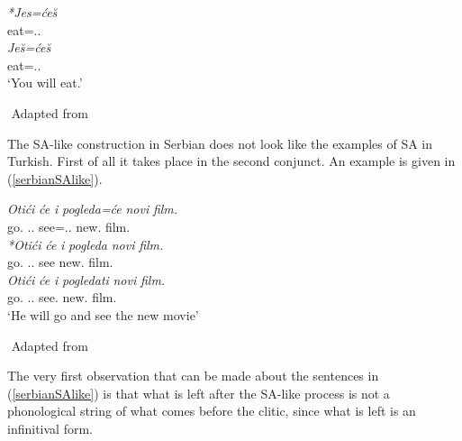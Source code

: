 \begin{exe}
    \ex \label{serbiance2}
    \begin{xlist}
        \ex 
        \gll 
        \textit{*Jes=\'{c}e\u{s}} \\ eat={\Aux}.{\Ssg}.{\Fut} \\
    
        \ex
        \gll 
        \textit{Je\u{s}=\'{c}e\u{s}} \\ eat={\Aux}.{\Ssg}.{\Fut} \\
        \glt `You will eat.'
    \end{xlist}
    ${}$ \hfill Adapted from \cite{despic2017suspended}
\end{exe}

The SA-like construction in Serbian does not look like the examples of SA in Turkish. First of all it takes place in the second conjunct. An example is given in (\ref{serbianSAlike}).

\begin{exe}
    \ex \label{serbianSAlike}
    \begin{xlist}
        \ex 
        \gll 
        \textit{Oti\'{c}i} \textit{\'{c}e} \textit{i} \textit{pogleda=\'{c}e} \textit{novi} \textit{film.} \\ go.{\Inf} {\Aux}.{\Tsg}.{\Fut} {\And} see={\Aux}.{\Tsg}.{\Fut} new.{\Acc} film.{\Acc} \\
        
        \ex 
        \gll 
        \textit{*Oti\'{c}i} \textit{\'{c}e} \textit{i} \textit{pogleda} \textit{novi} \textit{film.} \\ go.{\Inf} {\Aux}.{\Tsg}.{\Fut} {\And} see new.{\Acc} film.{\Acc} \\
        
        \ex 
        \gll 
        \textit{Oti\'{c}i} \textit{\'{c}e} \textit{i} \textit{pogledati} \textit{novi} \textit{film.} \\ go.{\Inf} {\Aux}.{\Tsg}.{\Fut} {\And} see.{\Inf} new.{\Acc} film.{\Acc} \\
        \glt `He will go and see the new movie'
    \end{xlist}
    ${}$ \hfill Adapted from \cite{despic2017suspended}
\end{exe}

The very first observation that can be made about the sentences in (\ref{serbianSAlike}) is that what is left after the SA-like process is not a phonological string of what comes before the clitic, since what is left is an infinitival form.


